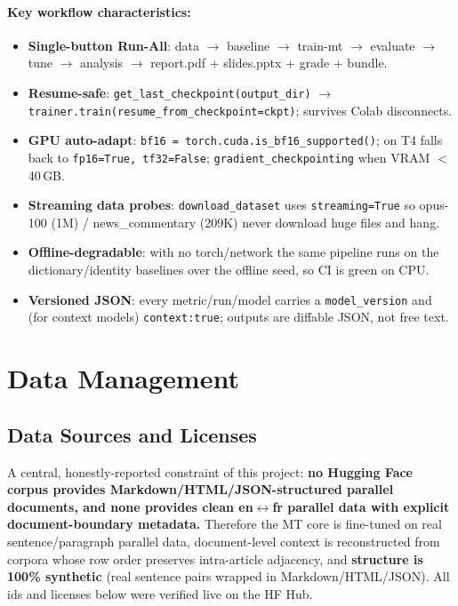 \documentclass[12pt,a4paper]{article}
\begin{document}
\paragraph{Key workflow characteristics:}
\begin{itemize}\setlength\itemsep{0.15em}
  \item \textbf{Single-button Run-All}: data $\rightarrow$ baseline $\rightarrow$ train-mt $\rightarrow$ evaluate $\rightarrow$ tune $\rightarrow$ analysis $\rightarrow$ report.pdf + slides.pptx + grade + bundle.
  \item \textbf{Resume-safe}: \texttt{get\_last\_checkpoint(output\_dir)} $\rightarrow$ \texttt{trainer.train(resume\_from\_checkpoint=ckpt)}; survives Colab disconnects.
  \item \textbf{GPU auto-adapt}: \texttt{bf16 = torch.cuda.is\_bf16\_supported()}; on T4 falls back to \texttt{fp16=True, tf32=False}; \texttt{gradient\_checkpointing} when VRAM $<$ 40\,GB.
  \item \textbf{Streaming data probes}: \texttt{download\_dataset} uses \texttt{streaming=True} so opus-100 (1M) / news\_commentary (209K) never download huge files and hang.
  \item \textbf{Offline-degradable}: with no torch/network the same pipeline runs on the dictionary/identity baselines over the offline seed, so CI is green on CPU.
  \item \textbf{Versioned JSON}: every metric/run/model carries a \texttt{model\_version} and (for context models) \texttt{context:true}; outputs are diffable JSON, not free text.
\end{itemize}

\section{Data Management}

\subsection{Data Sources and Licenses}

A central, honestly-reported constraint of this project: \textbf{no Hugging Face corpus provides Markdown/HTML/JSON-structured parallel documents, and none provides clean en$\leftrightarrow$fr parallel data with explicit document-boundary metadata.} Therefore the MT core is fine-tuned on real sentence/paragraph parallel data, document-level context is reconstructed from corpora whose row order preserves intra-article adjacency, and \textbf{structure is 100\% synthetic} (real sentence pairs wrapped in Markdown/HTML/JSON). All ids and licenses below were verified live on the HF Hub.
\end{document}
